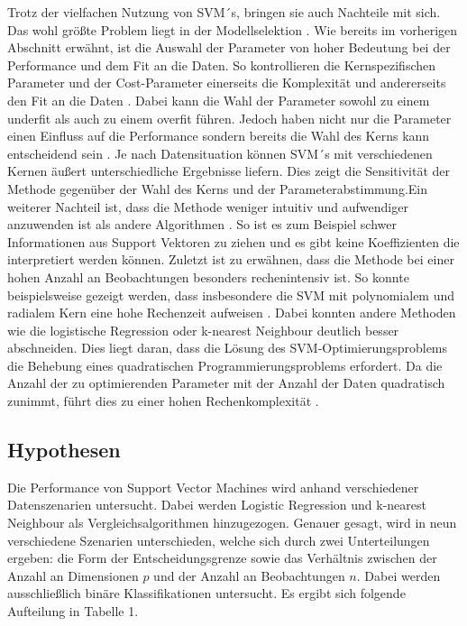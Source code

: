 \documentclass[
]{article}
\begin{document}
Trotz der vielfachen Nutzung von SVM´s, bringen sie auch Nachteile mit
sich. Das wohl größte Problem liegt in der Modellselektion
\parencite{bennettSupportVectorMachines2000}. Wie bereits im vorherigen
Abschnitt erwähnt, ist die Auswahl der Parameter von hoher Bedeutung bei
der Performance und dem Fit an die Daten. So kontrollieren die
Kernspezifischen Parameter und der Cost-Parameter einerseits die
Komplexität und andererseits den Fit an die Daten
\parencite{kuhnAppliedPredictiveModeling2013}. Dabei kann die Wahl der
Parameter sowohl zu einem underfit als auch zu einem overfit führen.
Jedoch haben nicht nur die Parameter einen Einfluss auf die Performance
sondern bereits die Wahl des Kerns kann entscheidend sein
\parencite{burgesTutorialSupportVector1998}. Je nach Datensituation
können SVM´s mit verschiedenen Kernen äußert unterschiedliche Ergebnisse
liefern. Dies zeigt die Sensitivität der Methode gegenüber der Wahl des
Kerns und der Parameterabstimmung.\newline Ein weiterer Nachteil ist,
dass die Methode weniger intuitiv und aufwendiger anzuwenden ist als
andere Algorithmen \parencite{bennettSupportVectorMachines2000}. So ist
es zum Beispiel schwer Informationen aus Support Vektoren zu ziehen und
es gibt keine Koeffizienten die interpretiert werden können.\newline
Zuletzt ist zu erwähnen, dass die Methode bei einer hohen Anzahl an
Beobachtungen besonders rechenintensiv ist. So konnte beispielsweise
gezeigt werden, dass insbesondere die SVM mit polynomialem und radialem
Kern eine hohe Rechenzeit aufweisen
\parencite{scholzComparisonClassificationMethods2021}. Dabei konnten
andere Methoden wie die logistische Regression oder k-nearest Neighbour
deutlich besser abschneiden. Dies liegt daran, dass die Lösung des
SVM-Optimierungsproblems die Behebung eines quadratischen
Programmierungsproblems erfordert. Da die Anzahl der zu optimierenden
Parameter mit der Anzahl der Daten quadratisch zunimmt, führt dies zu
einer hohen Rechenkomplexität
\parencite{kecmanSupportVectorMachines2005}.

\subsection{Hypothesen}

Die Performance von Support Vector Machines wird anhand verschiedener
Datenszenarien untersucht. Dabei werden Logistic Regression und
k-nearest Neighbour als Vergleichsalgorithmen hinzugezogen. Genauer
gesagt, wird in neun verschiedene Szenarien unterschieden, welche sich
durch zwei Unterteilungen ergeben: die Form der Entscheidungsgrenze
sowie das Verhältnis zwischen der Anzahl an Dimensionen \(p\) und der
Anzahl an Beobachtungen \(n\). Dabei werden ausschließlich binäre
Klassifikationen untersucht. Es ergibt sich folgende Aufteilung in
Tabelle 1.
\end{document}
